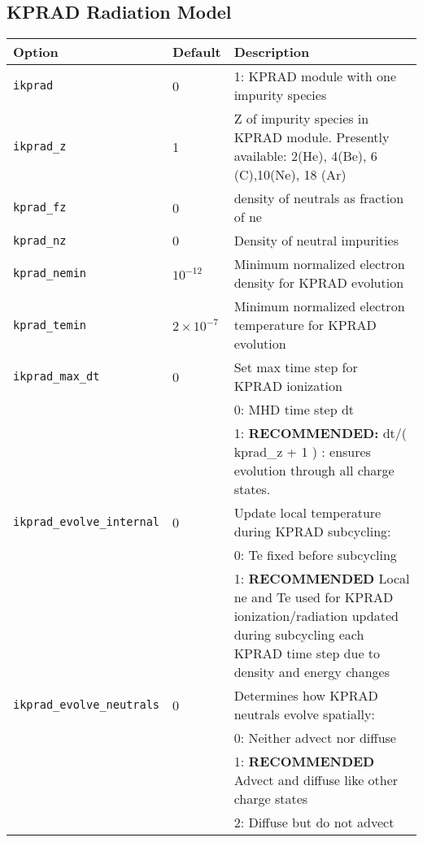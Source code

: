 \subsection{KPRAD Radiation Model}

\begin{tabular}{llp{4.5in}}
  \textbf{Option}&\textbf{Default}&\textbf{Description}\\
  \hline
 \texttt{ikprad}        & 0 & 1: KPRAD module with one impurity species \\
 \texttt{ikprad\_z}     & 1 & Z of impurity species in KPRAD module.   Presently available:
                                  2(He), 4(Be), 6 (C),10(Ne), 18 (Ar) \\
 \texttt{kprad\_fz}      & 0 & density of neutrals as fraction of ne \\
 \texttt{kprad\_nz}      & 0 & Density of neutral impurities \\
 \texttt{kprad\_nemin}   & $10^{-12}$& Minimum normalized electron density for KPRAD evolution \\
 \texttt{kprad\_temin}   & $ 2 \times 10^{-7} $ & Minimum normalized electron temperature for KPRAD evolution \\
 \texttt{ikprad\_max\_dt}&  0 & Set max time step for KPRAD ionization \\
                         &    & 0: MHD time step dt \\
                         &    & 1: {\bf RECOMMENDED:} dt/( kprad\_z + 1 ) : ensures evolution through all charge states. \\
 \texttt{ikprad\_evolve\_internal}  & 0 & Update local temperature during KPRAD subcycling: \\
                                    &   & 0: Te fixed before subcycling \\
                                    &   & 1: {\bf RECOMMENDED} Local ne and Te used for KPRAD 
                                                  ionization/radiation updated during subcycling each 
                                                  KPRAD time step due to density and energy changes \\
\texttt{ikprad\_evolve\_neutrals}   & 0 & Determines how KPRAD  neutrals evolve spatially: \\
                                    &   & 0: Neither advect nor diffuse \\
                                    &   & 1: {\bf RECOMMENDED} Advect and diffuse like other charge states \\
                                    &   & 2: Diffuse but do not advect \\
 


\end{tabular}
